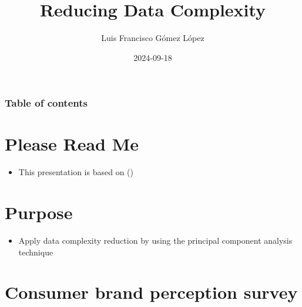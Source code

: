 \documentclass[
  ignorenonframetext,
]{beamer}
\title{Reducing Data Complexity}
\author{Luis Francisco Gómez López}
\date{2024-09-18}
\institute{FAEDIS}
\providecommand{\tightlist}{%
  \setlength{\itemsep}{0pt}\setlength{\parskip}{0pt}}\usepackage{longtable,booktabs,array}
\renewcommand*\contentsname{Table of contents}
\newcommand\contentsname{Table of contents}
\begin{document}
\frame{\titlepage}

\renewcommand*\contentsname{Table of contents}
\begin{frame}[allowframebreaks]
  \frametitle{Table of contents}
  \tableofcontents[hideallsubsections]
\end{frame}

\section{Please Read Me}\label{please-read-me}

\begin{frame}{}
\label{section}
\begin{itemize}
\tightlist
\item
  This presentation is based on ()
\end{itemize}
\end{frame}

\section{Purpose}\label{purpose}

\begin{frame}{}
\label{section-1}
\begin{itemize}
\tightlist
\item
  Apply data complexity reduction by using the principal component
  analysis technique
\end{itemize}
\end{frame}

\section{Consumer brand perception
survey}\label{consumer-brand-perception-survey}
\end{document}
